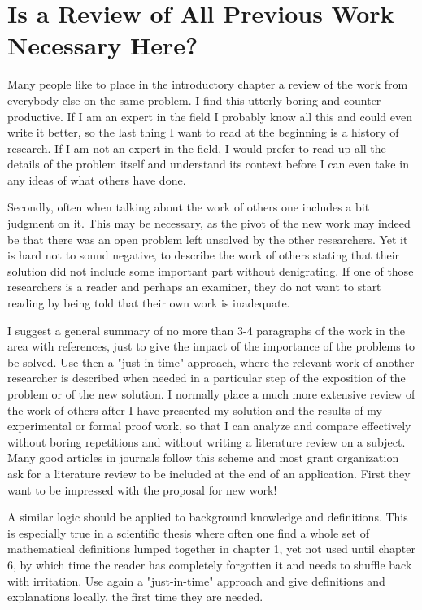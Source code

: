 \section{Is a Review of All Previous Work Necessary Here?}

Many people like to place in the introductory chapter a review of the work from everybody else on the same problem. I find this utterly boring and counter-productive. If I am an expert in the field I probably know all this and could even write it better, so the last thing I want to read at the beginning is a history of research. If I am not an expert in the field, I would prefer to read up all the details of the problem itself and understand its context before I can even take in any ideas of what others have done.

Secondly, often when talking about the work of others one includes a bit judgment on it. This may be necessary, as the pivot of the new work may indeed be that there was an open problem left unsolved by the other researchers. Yet it is hard not to sound negative, to describe the work of others stating that their solution did not include some important part without denigrating. If one of those researchers is a reader and perhaps an examiner, they do not want to start reading by being told that their own work is inadequate.

I suggest a general summary of no more than 3-4 paragraphs of the work in the area with references, just to give the impact of the importance of the problems to be solved. Use then a "just-in-time" approach, where the relevant work of another researcher is described when needed in a particular step of the exposition of the problem or of the new solution. I normally place a much more extensive review of the work of others after I have presented my solution and the results of my experimental or formal proof work, so that I can analyze and compare effectively without boring repetitions and without writing a literature review on a subject. Many good articles in journals follow this scheme and most grant organization ask for a literature review to be included at the end of an application. First they want to be impressed with the proposal for new work!

A similar logic should be applied to background knowledge and definitions. This is especially true in a scientific thesis where often one find a whole set of mathematical definitions lumped together in chapter 1, yet not used until chapter 6, by which time the reader has completely forgotten it and needs to shuffle back with irritation. Use again a "just-in-time" approach and give definitions and explanations locally, the first time they are needed.